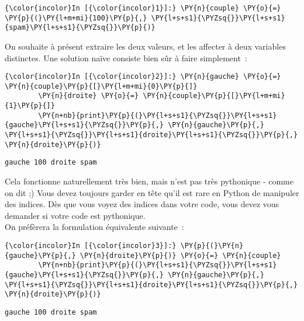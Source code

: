    \begin{Verbatim}[commandchars=\\\{\}]
{\color{incolor}In [{\color{incolor}1}]:} \PY{n}{couple} \PY{o}{=} \PY{p}{(}\PY{l+m+mi}{100}\PY{p}{,} \PY{l+s+s1}{\PYZsq{}}\PY{l+s+s1}{spam}\PY{l+s+s1}{\PYZsq{}}\PY{p}{)}
\end{Verbatim}


    On souhaite à présent extraire les deux valeurs, et les affecter à deux
variables distinctes. Une solution naïve consiste bien sûr à faire
simplement~:

    \begin{Verbatim}[commandchars=\\\{\}]
{\color{incolor}In [{\color{incolor}2}]:} \PY{n}{gauche} \PY{o}{=} \PY{n}{couple}\PY{p}{[}\PY{l+m+mi}{0}\PY{p}{]}
        \PY{n}{droite} \PY{o}{=} \PY{n}{couple}\PY{p}{[}\PY{l+m+mi}{1}\PY{p}{]}
        \PY{n+nb}{print}\PY{p}{(}\PY{l+s+s1}{\PYZsq{}}\PY{l+s+s1}{gauche}\PY{l+s+s1}{\PYZsq{}}\PY{p}{,} \PY{n}{gauche}\PY{p}{,} \PY{l+s+s1}{\PYZsq{}}\PY{l+s+s1}{droite}\PY{l+s+s1}{\PYZsq{}}\PY{p}{,} \PY{n}{droite}\PY{p}{)}
\end{Verbatim}


    \begin{Verbatim}[commandchars=\\\{\}]
gauche 100 droite spam

    \end{Verbatim}

    Cela fonctionne naturellement très bien, mais n'est pas très pythonique
- comme on dit ;) Vous devez toujours garder en tête qu'il est rare en
Python de manipuler des indices. Dès que vous voyez des indices dans
votre code, vous devez vous demander si votre code est pythonique.\\

On préfèrera la formulation équivalente suivante~:

    \begin{Verbatim}[commandchars=\\\{\}]
{\color{incolor}In [{\color{incolor}3}]:} \PY{p}{(}\PY{n}{gauche}\PY{p}{,} \PY{n}{droite}\PY{p}{)} \PY{o}{=} \PY{n}{couple}
        \PY{n+nb}{print}\PY{p}{(}\PY{l+s+s1}{\PYZsq{}}\PY{l+s+s1}{gauche}\PY{l+s+s1}{\PYZsq{}}\PY{p}{,} \PY{n}{gauche}\PY{p}{,} \PY{l+s+s1}{\PYZsq{}}\PY{l+s+s1}{droite}\PY{l+s+s1}{\PYZsq{}}\PY{p}{,} \PY{n}{droite}\PY{p}{)}
\end{Verbatim}


    \begin{Verbatim}[commandchars=\\\{\}]
gauche 100 droite spam

    \end{Verbatim}

